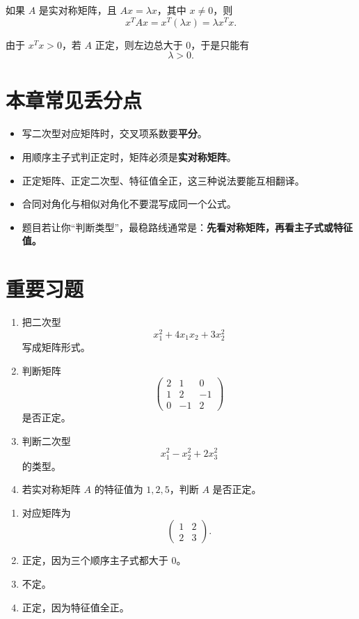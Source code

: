 \documentclass[11pt,oneside,UTF8]{ctexbook}
\newcommand{\important}[1]{\textcolor{Sakura}{\textbf{#1}}}
\begin{document}
如果 \(A\) 是实对称矩阵，且 \(Ax=\lambda x\)，其中 \(x\neq 0\)，则
\[
x^TAx=x^T(\lambda x)=\lambda x^Tx.
\]

由于 \(x^Tx>0\)，若 \(A\) 正定，则左边总大于 0，于是只能有
\[
\lambda>0.
\]

\section{本章常见丢分点}

\begin{summarybox}[最后的补考提醒]
\begin{itemize}
  \item 写二次型对应矩阵时，交叉项系数要\important{平分}。
  \item 用顺序主子式判正定时，矩阵必须是\important{实对称矩阵}。
  \item 正定矩阵、正定二次型、特征值全正，这三种说法要能互相翻译。
  \item 合同对角化与相似对角化不要混写成同一个公式。
  \item 题目若让你“判断类型”，最稳路线通常是：\important{先看对称矩阵，再看主子式或特征值。}
\end{itemize}
\end{summarybox}

\section{重要习题}

\begin{exercisebox}[第 5 章重要习题]
\begin{enumerate}
  \item 把二次型
  \[
  x_1^2+4x_1x_2+3x_2^2
  \]
  写成矩阵形式。
  \item 判断矩阵
  \[
  \begin{pmatrix}
  2&1&0\\
  1&2&-1\\
  0&-1&2
  \end{pmatrix}
  \]
  是否正定。
  \item 判断二次型
  \[
  x_1^2-x_2^2+2x_3^2
  \]
  的类型。
  \item 若实对称矩阵 \(A\) 的特征值为 \(1,2,5\)，判断 \(A\) 是否正定。
\end{enumerate}
\end{exercisebox}

\begin{summarybox}[答案提示]
\begin{enumerate}
  \item 对应矩阵为
  \[
  \begin{pmatrix}
  1&2\\
  2&3
  \end{pmatrix}.
  \]
  \item 正定，因为三个顺序主子式都大于 0。
  \item 不定。
  \item 正定，因为特征值全正。
\end{enumerate}
\end{summarybox}
\end{document}
